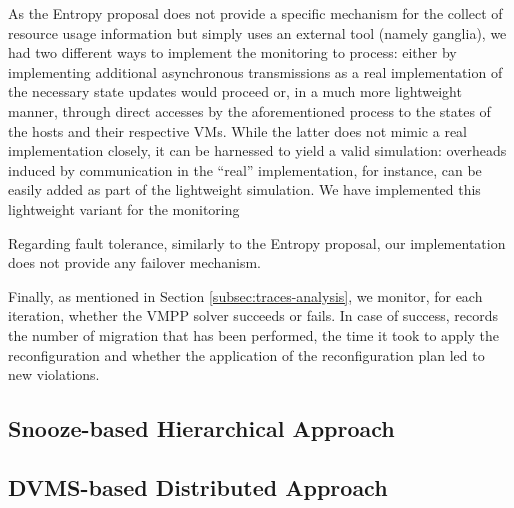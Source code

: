 
As the Entropy proposal does not provide a specific mechanism for the
collect of resource usage information but simply uses an external tool
(namely ganglia), we had two different ways to implement the monitoring to
process:  either by implementing additional asynchronous transmissions
as a real implementation of the necessary state updates would proceed
or, in a much more lightweight manner, through direct accesses by the
aforementioned process to the states of the hosts and their respective
VMs. While the latter does not mimic a real implementation closely, it
can be harnessed to yield a valid simulation: overheads induced by
communication in the ``real'' implementation, for instance, can be
easily added as part of the lightweight simulation. We have
implemented this lightweight variant for the monitoring

Regarding fault tolerance, similarly to the Entropy proposal, our
implementation does not provide any failover mechanism.

Finally, as mentioned in Section \ref{subsec:traces-analysis}, we monitor, for each iteration,
whether the VMPP solver succeeds or fails. In case of success, \vmps
records the number of migration that has been performed, the time it
took to apply the reconfiguration and whether
the application of the reconfiguration plan led to new violations.

\subsection{Snooze-based Hierarchical Approach}
\label{subsec:snooze}


\subsection{DVMS-based Distributed Approach}
\label{subsec:dvms}




